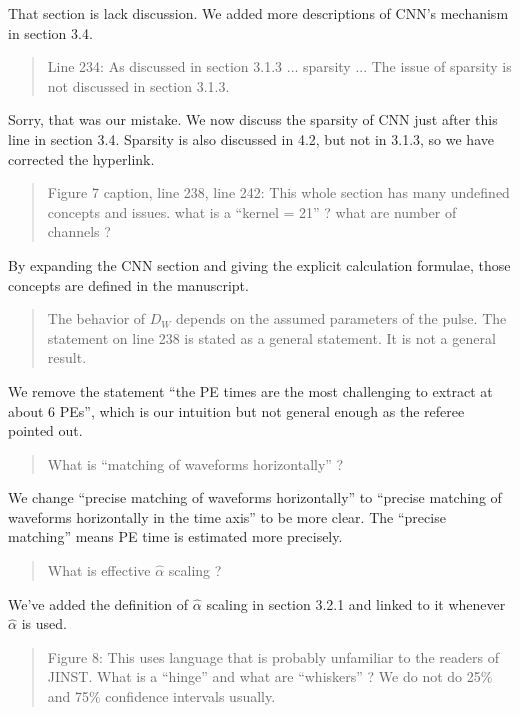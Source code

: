 \documentclass[12pt]{article}
\begin{document}
That section is lack discussion.  We added more descriptions of CNN's mechanism in section 3.4.

\begin{quote}
Line 234: As discussed in section 3.1.3 ... sparsity ... The issue of sparsity is not discussed in section 3.1.3.
\end{quote}

Sorry, that was our mistake. We now discuss the sparsity of CNN just after this line in section 3.4. Sparsity is also discussed in 4.2, but not in 3.1.3, so we have corrected the hyperlink.

\begin{quote}
Figure 7 caption, line 238, line 242: This whole section has many undefined concepts and issues. what is a ``kernel = 21'' ? what are number of channels ?
\end{quote}

By expanding the CNN section and giving the explicit calculation formulae, those concepts are defined in the manuscript.

\begin{quote}
    The behavior of $D_W$ depends on the assumed parameters of the pulse. The statement on line 238 is stated as a general statement. It is not a general result. 
\end{quote}

We remove the statement ``the PE times are the most challenging to extract at about 6 PEs'', which is our intuition but not general enough as the referee pointed out.

\begin{quote}
    What is ``matching of waveforms horizontally'' ?
\end{quote}

We change ``precise matching of waveforms horizontally'' to ``precise matching of waveforms horizontally in the time axis'' to be more clear. The ``precise matching'' means PE time is estimated more precisely. 

\begin{quote}
    What is effective $\hat{\alpha}$ scaling ?
\end{quote}

We've added the definition of $\hat{\alpha}$ scaling in section 3.2.1 and linked to it  whenever $\hat{\alpha}$ is used.

\begin{quote}
Figure 8: This uses language that is probably unfamiliar to the readers of JINST. What is a ``hinge'' and what are ``whiskers'' ? We do not do 25\% and 75\% confidence intervals usually.
\end{quote}
\end{document}
